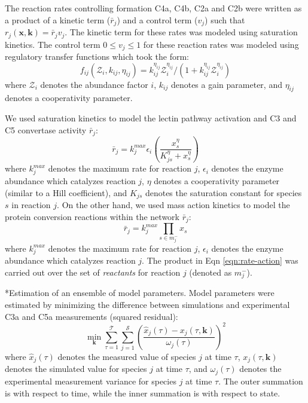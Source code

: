 \documentclass[12pt]{article}
\makeatletter
\renewcommand\subsection{\@startsection
	{subsection}{2}{0mm}
	{-0.05in}
	{-0.5\baselineskip}
	{\normalfont\normalsize\bfseries}}
\makeatother
\begin{document}
The reaction rates controlling formation C4a, C4b, C2a and C2b were written as a product of a kinetic term ($\bar{r}_{j}$) and a control term ($v_{j}$) such that $r_{j}\left(\mathbf{x},\mathbf{k}\right) = \bar{r}_{j}v_{j}$. The kinetic term for these rates was modeled using saturation kinetics.  The control term $0\leq v_{j}\leq 1$ for these reaction rates was modeled using regulatory transfer functions which took the form:
\begin{equation}\label{eqn:control-factor}
	f_{ij}\left(\mathcal{Z}_{i},k_{ij},\eta_{ij}\right) = k_{ij}^{\eta_{ij}}\mathcal{Z}_{i}^{\eta_{ij}}/\left({1 + k_{ij}^{\eta_{ij}}\mathcal{Z}_{i}^{\eta_{ij}}}\right)
\end{equation}where $\mathcal{Z}_{i}$ denotes the abundance factor $i$, $k_{ij}$ denotes a gain parameter, and $\eta_{ij}$ denotes a cooperativity parameter.

We used saturation kinetics to model the lectin pathway activation and C3 and C5 convertase activity $\bar{r}_{j}$:
\begin{equation}\label{eqn:rate-saturation}
	\bar{r}_{j} = k_{j}^{max}\epsilon_{i}\left(\frac{x_{s}^{\eta}}{K_{js}^{\eta} + x_{s}^{\eta}}\right)
\end{equation}
where $k_{j}^{max}$ denotes the maximum rate for reaction $j$, $\epsilon_{i}$ denotes the enzyme abundance which catalyzes reaction $j$, $\eta$ denotes a cooperativity parameter (similar to a Hill coefficient), and $K_{js}$ denotes the saturation constant for species $s$ in reaction $j$. On the other hand,
we used mass action kinetics to model the protein conversion reactions within the network $\bar{r}_{j}$:
\begin{equation}\label{eqn:rate-action}
	\bar{r}_{j} = k_{j}^{max}\prod_{s\in{m_{j}^{-}}}x_{s}
\end{equation}
where $k_{j}^{max}$ denotes the maximum rate for reaction $j$, $\epsilon_{i}$ denotes the enzyme abundance which catalyzes reaction $j$. The product in Eqn \eqref{eqn:rate-action} was carried out over the set of \textit{reactants} for reaction $j$ (denoted as $m_{j}^{-}$).


\subsection*{Estimation of an ensemble of model parameters.}
Model parameters were estimated by minimizing the difference between simulations and experimental C3a and C5a measurements (squared residual):
\begin{equation}\label{eqn:objective-function}
	\min_{\mathbf{k}} \sum_{\tau=1}^{\mathcal{T}}\sum_{j=1}^{\mathcal{S}}\left(\frac{\hat{x}_{j}\left(\tau\right) - x_{j}\left(\tau,\mathbf{k}\right)}{\omega_{j}\left(\tau\right)}\right)^{2}
\end{equation}where $\hat{x}_{j}\left(\tau\right)$ denotes the measured value of species $j$ at time $\tau$, $x_{j}\left(\tau,\mathbf{k}\right)$ denotes the simulated
value for species $j$ at time $\tau$, and $\omega_{j}\left(\tau\right)$ denotes the experimental measurement variance for species $j$ at time $\tau$. The outer summation is with respect to
time, while the inner summation is with respect to state.
\end{document}
